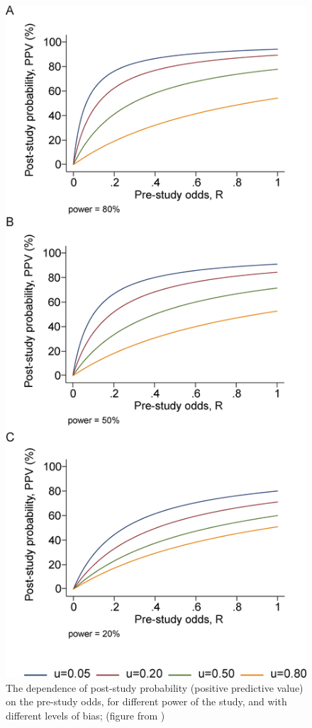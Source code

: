 \documentclass[
  letterpaper,
  DIV=11,
  numbers=noendperiod]{scrreprt}
\begin{document}
\begin{figure}

{\centering \includegraphics{./ch7/ioannidis_bayes.png}

}

\caption{The dependence of post-study probability (positive predictive
value) on the pre-study odds, for different power of the study, and with
different levels of bias; (figure from \cite{ioannidis_why_2005})}

\end{figure}
\end{document}
